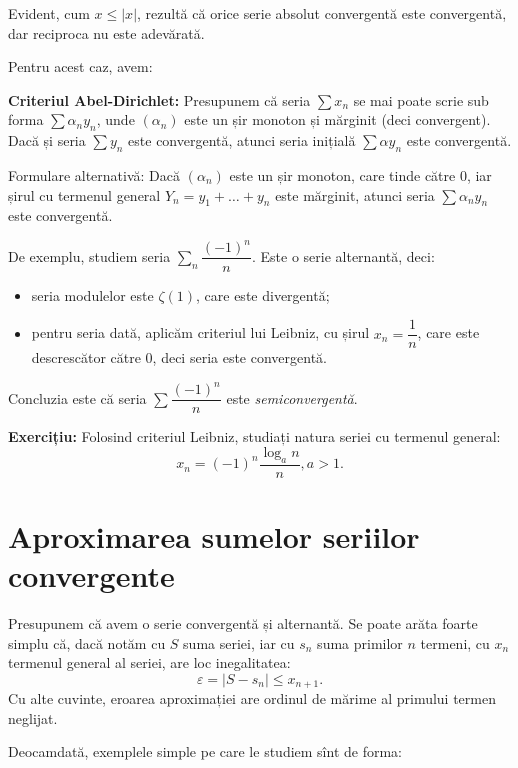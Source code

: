 Evident, cum $ x \leq |x| $, rezultă că orice serie absolut convergentă este
convergentă, dar reciproca nu este adevărată.

Pentru acest caz, avem:

\textbf{Criteriul Abel-Dirichlet:} Presupunem că seria $ \sum x_n $ se mai poate
scrie sub forma $ \sum \alpha_n y_n $, unde $ (\alpha_n) $ este un șir monoton
și mărginit (deci convergent). Dacă și seria $ \sum y_n $ este convergentă,
atunci seria inițială $ \sum \alpha y_n $ este convergentă.

Formulare alternativă: Dacă $ (\alpha_n) $ este un șir monoton, care tinde
către 0, iar șirul cu termenul general $ Y_n = y_1 + \dots + y_n $ este
mărginit, atunci seria $ \sum \alpha_n y_n $ este convergentă.

De exemplu, studiem seria $ \sum_n \dfrac{(-1)^n}{n} $. Este o serie
alternantă, deci:
\begin{itemize}
    \item seria modulelor este $ \zeta(1) $, care este divergentă;
    \item pentru seria dată, aplicăm criteriul lui Leibniz, cu șirul $ x_n = \dfrac{1}{n} $,
        care este descrescător către 0, deci seria este convergentă.
\end{itemize}

Concluzia este că seria $ \sum \dfrac{(-1)^n}{n} $ este \emph{semiconvergentă}.

\textbf{Exercițiu:} Folosind criteriul Leibniz, studiați natura seriei cu termenul general:
\[
    x_n = (-1)^n \dfrac{\log_a n}{n}, a > 1.
\]

\section{Aproximarea sumelor seriilor convergente}

Presupunem că avem o serie convergentă și alternantă. Se poate arăta foarte
simplu că, dacă notăm cu $ S $ suma seriei, iar cu $ s_n $ suma primilor $ n $
termeni, cu $ x_n $ termenul general al seriei, are loc inegalitatea:
\begin{equation}\label{eq:aprox}
    \varepsilon = | S - s_n | \leq x_{n + 1}.
\end{equation}
Cu alte cuvinte, eroarea aproximației are ordinul de mărime al primului
termen neglijat.

Deocamdată, exemplele simple pe care le studiem sînt de forma:

